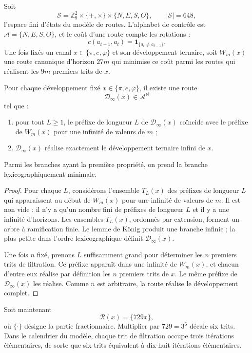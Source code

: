 Soit
\[
\mathcal S
=\mathbb Z_9^2
\times\{+,\times\}
\times\{N,E,S,O\},
\qquad
|\mathcal S|=648,
\]
l'espace fini d'états du modèle de routes. L'alphabet de contrôle est
\(\mathcal A=\{N,E,S,O\}\), et le coût d'une route compte les rotations :
\[
c(a_{t-1},a_t)=\mathbf1_{\{a_t\neq a_{t-1}\}}.
\]
Une fois fixés un canal \(x\in\{\pi,e,\varphi\}\) et son développement ternaire, soit
\(W_m(x)\) une route canonique d'horizon \(27m\) qui minimise ce coût
parmi les routes qui réalisent les \(9m\) premiers trits de \(x\).

\begin{theorem}
\label{thm:rayo-coinductivo-condicionado-rev6}
Pour chaque développement fixé \(x\in\{\pi,e,\varphi\}\), il existe une route
\[
\mathcal D_\infty(x)\in\mathcal A^{\mathbb N}
\]
tel que :
\begin{enumerate}
\item pour tout \(L\geq1\), le préfixe de longueur \(L\) de
\(\mathcal D_\infty(x)\) coïncide avec le préfixe de \(W_m(x)\) pour
une infinité de valeurs de \(m\) ;
\item \(\mathcal D_\infty(x)\) réalise exactement le développement ternaire
infini de \(x\).
\end{enumerate}
Parmi les branches ayant la première propriété, on prend la branche lexicographiquement
minimale.
\end{theorem}

\begin{proof}
Pour chaque \(L\), considérons l'ensemble \(T_L(x)\) des préfixes de longueur
\(L\) qui apparaissent au début de \(W_m(x)\) pour une infinité de valeurs de
\(m\). Il est non vide : il n'y a qu'un nombre fini de préfixes de longueur \(L\) et il y a
une infinité d'horizons. Les ensembles \(T_L(x)\), ordonnés par extension,
forment un arbre à ramification finie. Le lemme de König produit une branche
infinie ; la plus petite dans l'ordre lexicographique définit
\(\mathcal D_\infty(x)\).

Une fois \(n\) fixé, prenons \(L\) suffisamment grand pour déterminer les \(n\) premiers
trits de filtration. Ce préfixe apparaît dans une infinité de \(W_m(x)\), et chacun
d'entre eux réalise par définition les \(n\) premiers trits de \(x\). Le même
préfixe de \(\mathcal D_\infty(x)\) les réalise. Comme \(n\) est arbitraire,
la route réalise le développement complet.
\end{proof}

Soit maintenant
\[
\mathcal R(x)=\{729x\},
\]
où \(\{\cdot\}\) désigne la partie fractionnaire. Multiplier par
\(729=3^6\) décale six trits. Dans le calendrier du modèle, chaque trit de
filtration occupe trois itérations élémentaires, de sorte que six trits
équivalent à dix-huit itérations élémentaires.

